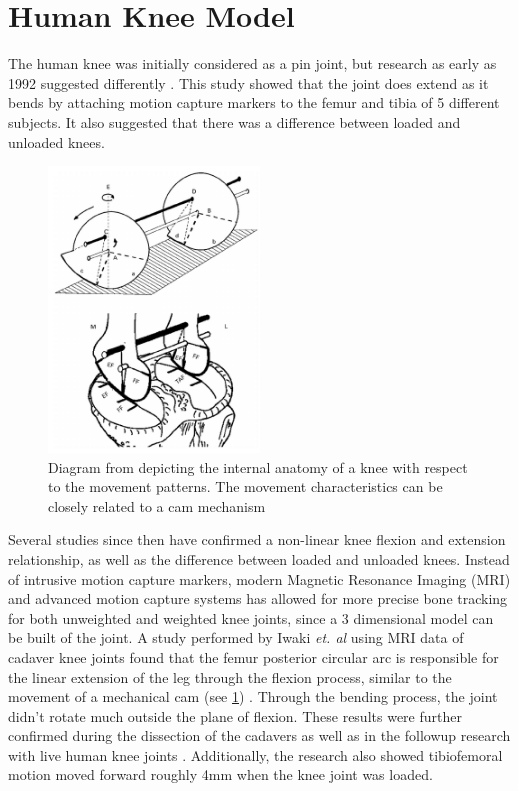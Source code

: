 \section{Human Knee Model}
\label{sec:KneeModel}

The human knee was initially considered as a pin joint, but research as early as 1992 suggested differently \cite{3DKinKneeJointOldStabby}. This study showed that the joint does extend as it bends by attaching motion capture markers to the femur and tibia of 5 different subjects. It also suggested that there was a difference between loaded and unloaded knees. 

\begin{figure}[h!]
    \centering
    \includegraphics[width=0.5\textwidth]{Figures/Background/KneeAnatomy1.png}
    \caption{Diagram from \cite{MRIKneeShape_Unloaded} depicting the internal anatomy of a knee with respect to the movement patterns. The movement characteristics can be closely related to a cam mechanism}
    \label{fig:KneeAnatomyCam}
\end{figure}

Several studies since then have confirmed a non-linear knee flexion and extension relationship, as well as the difference between loaded and unloaded knees. Instead of intrusive motion capture markers, modern Magnetic Resonance Imaging (MRI) and advanced motion capture systems \cite{ModelAnalysisDeepKneeFlexion} has allowed for more precise bone tracking for both unweighted and weighted knee joints, since a 3 dimensional model can be built of the joint. A study performed by Iwaki \textit{et. al} using MRI data of cadaver knee joints found that the femur posterior circular arc is responsible for the linear extension of the leg through the flexion process, similar to the movement of a mechanical cam (see \ref{fig:KneeAnatomyCam}) \cite{MRIKneeShape_Unloaded}. Through the bending process, the joint didn't rotate much outside the plane of flexion. These results were further confirmed during the dissection of the cadavers as well as in the followup research with live human knee joints \cite{MRIKneeShape_Loaded}. Additionally, the research also showed tibiofemoral motion moved forward roughly 4mm when the knee joint was loaded.

